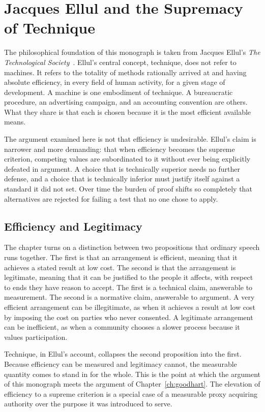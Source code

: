 \chapter{Jacques Ellul and the Supremacy of Technique}
\label{ch:ellul}

The philosophical foundation of this monograph is taken from Jacques Ellul's \emph{The Technological Society}~\cite{ellul1964}. Ellul's central concept, technique, does not refer to machines. It refers to the totality of methods rationally arrived at and having absolute efficiency, in every field of human activity, for a given stage of development. A machine is one embodiment of technique. A bureaucratic procedure, an advertising campaign, and an accounting convention are others. What they share is that each is chosen because it is the most efficient available means.

The argument examined here is not that efficiency is undesirable. Ellul's claim is narrower and more demanding: that when efficiency becomes the supreme criterion, competing values are subordinated to it without ever being explicitly defeated in argument. A choice that is technically superior needs no further defense, and a choice that is technically inferior must justify itself against a standard it did not set. Over time the burden of proof shifts so completely that alternatives are rejected for failing a test that no one chose to apply.

\section{Efficiency and Legitimacy}

The chapter turns on a distinction between two propositions that ordinary speech runs together. The first is that an arrangement is efficient, meaning that it achieves a stated result at low cost. The second is that the arrangement is legitimate, meaning that it can be justified to the people it affects, with respect to ends they have reason to accept. The first is a technical claim, answerable to measurement. The second is a normative claim, answerable to argument. A very efficient arrangement can be illegitimate, as when it achieves a result at low cost by imposing the cost on parties who never consented. A legitimate arrangement can be inefficient, as when a community chooses a slower process because it values participation.

Technique, in Ellul's account, collapses the second proposition into the first. Because efficiency can be measured and legitimacy cannot, the measurable quantity comes to stand in for the whole. This is the point at which the argument of this monograph meets the argument of Chapter~\ref{ch:goodhart}. The elevation of efficiency to a supreme criterion is a special case of a measurable proxy acquiring authority over the purpose it was introduced to serve.

